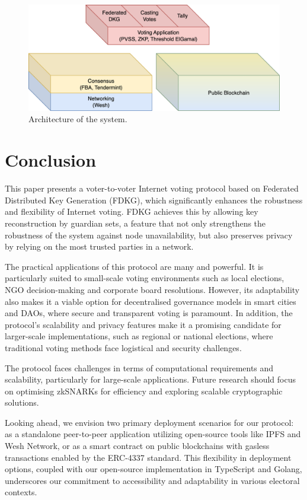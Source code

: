 \documentclass[runningheads]{llncs}
\begin{document}
\begin{figure}[H]
    \centering
    \includegraphics[width=\textwidth]{stack-bc.png}
    \caption{Architecture of the system.}
    \label{fig:stack-bc}
\end{figure}

\section{Conclusion}
This paper presents a voter-to-voter Internet voting protocol based on Federated Distributed Key Generation (FDKG), which significantly enhances the robustness and flexibility of Internet voting. FDKG achieves this by allowing key reconstruction by guardian sets, a feature that not only strengthens the robustness of the system against node unavailability, but also preserves privacy by relying on the most trusted parties in a network.

The practical applications of this protocol are many and powerful. It is particularly suited to small-scale voting environments such as local elections, NGO decision-making and corporate board resolutions. However, its adaptability also makes it a viable option for decentralised governance models in smart cities and DAOs, where secure and transparent voting is paramount. In addition, the protocol's scalability and privacy features make it a promising candidate for larger-scale implementations, such as regional or national elections, where traditional voting methods face logistical and security challenges.

The protocol faces challenges in terms of computational requirements and scalability, particularly for large-scale applications. Future research should focus on optimising zkSNARKs for efficiency and exploring scalable cryptographic solutions.

Looking ahead, we envision two primary deployment scenarios for our protocol: as a standalone peer-to-peer application utilizing open-source tools like IPFS and Wesh Network, or as a smart contract on public blockchains with gasless transactions enabled by the ERC-4337 standard. This flexibility in deployment options, coupled with our open-source implementation in TypeScript and Golang, underscores our commitment to accessibility and adaptability in various electoral contexts.
\end{document}
